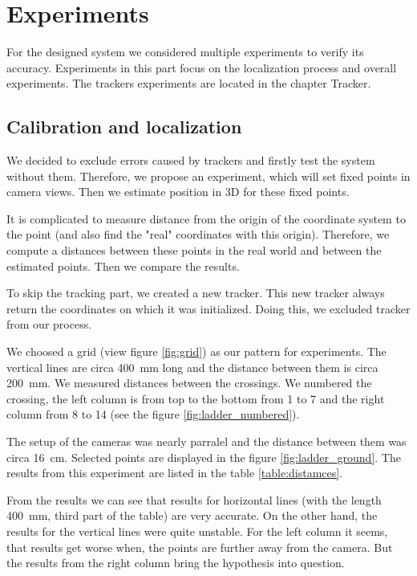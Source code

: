\chapter{Experiments} 

For the designed system we considered multiple experiments to
verify its accuracy. Experiments in this part focus on the localization process
and overall experiments. The trackers experiments are located in the chapter
Tracker.

\section{Calibration and localization}

We decided to exclude errors caused by trackers and firstly test the system
without them. Therefore, we propose an experiment, which will set fixed points
in camera views. Then we estimate position in 3D for these fixed points.

It is complicated to measure distance from the origin of the coordinate system
to the point (and also find the "real" coordinates with this origin).
Therefore, we compute a distances between these points in the real world and
between the estimated points. Then we compare the results.
 
To skip the tracking part, we created a new tracker. This new tracker always
return the coordinates on which it was initialized. Doing this, we excluded
tracker from our process.

We choosed a grid (view figure \ref{fig:grid}) as our pattern for experiments.
The vertical lines are circa 400~mm long and the distance between them is circa
200~mm. We measured distances between the crossings. We numbered the crossing,
the left column is from top to the bottom from 1 to 7 and the right column from
8 to 14 (see the figure \ref{fig:ladder_numbered}).

The setup of the cameras was nearly parralel and the distance between them was
circa 16~cm. Selected points are displayed in the figure \ref{fig:ladder_ground}. The
results from this experiment are listed in the table \ref{table:distamces}. 

From the results we can see that results for horizontal lines (with the length
400~mm, third part of the table) are very accurate. On the other hand, the
results for the vertical lines were quite unstable. For the left column it
seems, that results get worse when, the points are further away from the
camera. But the results from the right column bring the hypothesis into
question. 



